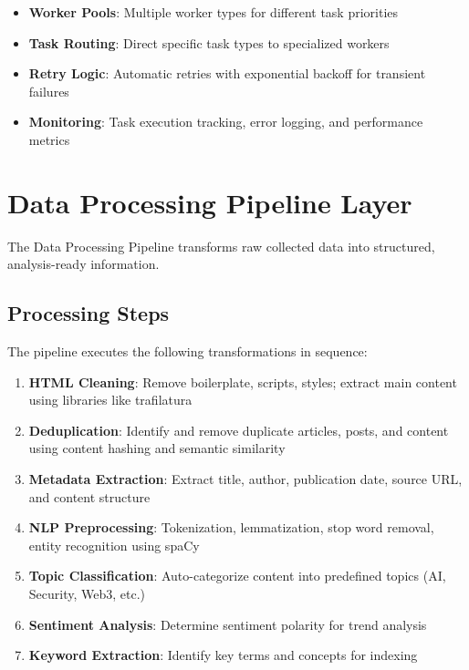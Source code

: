 \documentclass[12pt,a4paper]{report}
\begin{document}
\begin{itemize}[label=\textbullet]
    \item \textbf{Worker Pools}: Multiple worker types for different task priorities
    \item \textbf{Task Routing}: Direct specific task types to specialized workers
    \item \textbf{Retry Logic}: Automatic retries with exponential backoff for transient failures
    \item \textbf{Monitoring}: Task execution tracking, error logging, and performance metrics
\end{itemize}

\section{Data Processing Pipeline Layer}

The Data Processing Pipeline transforms raw collected data into structured, analysis-ready information.

\subsection{Processing Steps}

The pipeline executes the following transformations in sequence:

\begin{enumerate}
    \item \textbf{HTML Cleaning}: Remove boilerplate, scripts, styles; extract main content using libraries like trafilatura
    \item \textbf{Deduplication}: Identify and remove duplicate articles, posts, and content using content hashing and semantic similarity
    \item \textbf{Metadata Extraction}: Extract title, author, publication date, source URL, and content structure
    \item \textbf{NLP Preprocessing}: Tokenization, lemmatization, stop word removal, entity recognition using spaCy
    \item \textbf{Topic Classification}: Auto-categorize content into predefined topics (AI, Security, Web3, etc.)
    \item \textbf{Sentiment Analysis}: Determine sentiment polarity for trend analysis
    \item \textbf{Keyword Extraction}: Identify key terms and concepts for indexing
\end{enumerate}
\end{document}
